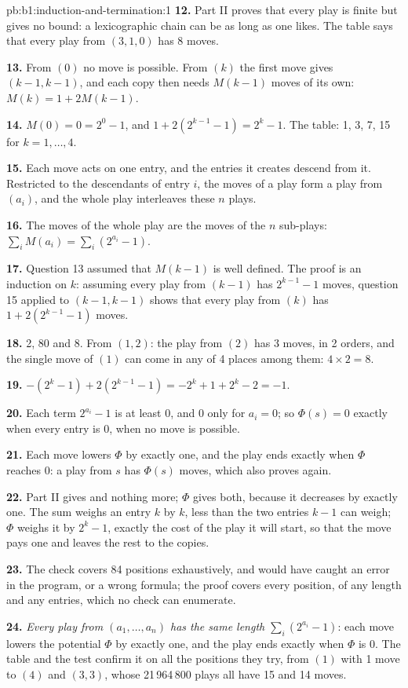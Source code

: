 \begin{solution}{pb:b1:induction-and-termination:1}
\textbf{12.} Part II proves that every play is finite but gives no bound: a lexicographic chain can be as long as one
likes. The table says that every play from $(3, 1, 0)$ has 8 moves.

\textbf{13.} From $(0)$ no move is possible. From $(k)$ the first move gives $(k - 1, k - 1)$, and each copy then needs
$M(k - 1)$ moves of its own: $M(k) = 1 + 2M(k - 1)$.

\textbf{14.} $M(0) = 0 = 2^0 - 1$, and $1 + 2(2^{k - 1} - 1) = 2^k - 1$. The table: 1, 3, 7, 15 for $k = 1, \dots, 4$.

\textbf{15.} Each move acts on one entry, and the entries it creates descend from it. Restricted to the descendants
of entry $i$, the moves of a play form a play from $(a_i)$, and the whole play interleaves these $n$ plays.

\textbf{16.} The moves of the whole play are the moves of the $n$ sub-plays: $\sum_i M(a_i) = \sum_i (2^{a_i} - 1)$.

\textbf{17.} Question 13 assumed that $M(k - 1)$ is well defined. The proof is an induction on $k$: assuming every play
from $(k - 1)$ has $2^{k - 1} - 1$ moves, question 15 applied to $(k - 1, k - 1)$ shows that every play from $(k)$ has
$1 + 2(2^{k - 1} - 1)$ moves.

\textbf{18.} 2, 80 and 8. From $(1, 2)$: the play from $(2)$ has 3 moves, in 2 orders, and the single move of $(1)$ can
come in any of 4 places among them: $4 \times 2 = 8$.

\textbf{19.} $-(2^k - 1) + 2(2^{k - 1} - 1) = -2^k + 1 + 2^k - 2 = -1$.

\textbf{20.} Each term $2^{a_i} - 1$ is at least 0, and 0 only for $a_i = 0$; so $\Phi(s) = 0$ exactly when every entry
is 0, when no move is possible.

\textbf{21.} Each move lowers $\Phi$ by exactly one, and the play ends exactly when $\Phi$ reaches 0: a play from $s$ has
$\Phi(s)$ moves, which also proves  again.

\textbf{22.} Part II gives  and nothing more; $\Phi$ gives both, because it decreases by exactly one. The sum
weighs an entry $k$ by $k$, less than the two entries $k - 1$ can weigh; $\Phi$ weighs it by $2^k - 1$, exactly the cost
of the play it will start, so that the move pays one and leaves the rest to the copies.

\textbf{23.} The check covers 84 positions exhaustively, and would have caught an error in the program, or a wrong
formula; the proof covers every position, of any length and any entries, which no check can enumerate.

\textbf{24.} \emph{Every play from $(a_1, \dots, a_n)$ has the same length $\sum_i (2^{a_i} - 1)$}: each move lowers the
potential $\Phi$ by exactly one, and the play ends exactly when $\Phi$ is 0. The table and the test confirm it on all
the positions they try, from $(1)$ with 1 move to $(4)$ and $(3, 3)$, whose 21\,964\,800 plays all have 15 and 14 moves.
\end{solution}
